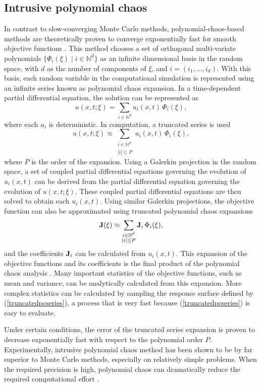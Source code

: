\subsection{Intrusive polynomial chaos}
In contrast to slow-converging Monte Carlo
methods, polynomial-chaos-based methods are theoretically proven to converge
exponentially fast for smooth objective functions \cite[]{poly_chaos}.
This method chooses a set of orthogonal multi-variate
polynomials $\{ \Phi_i(\xi) \;|\; i \in {\mathbb N}^d \}$ as an infinite
dimensional basis in the random space, with $d$ as the number of components
of $\xi$, and $i=(i_1,\ldots,i_d)$.
With this basis, each random variable
in the computational simulation is represented using an infinite series
known as polynomial chaos expansion.  In a time-dependent partial differential
equation, the solution can be represented as
\[ u(x, t; \xi) = \sum_{i \in {\mathbb N}^d} u_i(x, t)\,\Phi_i(\xi) , \]
where each $u_i$ is deterministic.  In computation, a truncated series is used
\begin{equation} \label{truncatedpcseries}
  u(x, t; \xi) \approx \sum_{\substack{i \in {\mathbb N}^d\\|i|\le P}}
   u_i(x, t)\,\Phi_i(\xi) ,
\end{equation}
where $P$ is the order of the expansion.  Using a Galerkin projection in
the random space, a set of coupled partial differential equations governing
the evolution of $u_i(x,t)$ can be derived from the partial differential
equation governing the evolution of $u(x,t;\xi)$.  These coupled partial
differential equations are then solved to obtain each $u_i(x,t)$.
Using similar Galerkin projections, the objective function can also be
approximated using truncated polynomial chaos expansions
\[ {\bf J}(\xi) \approx \sum_{\substack{i \in {\mathbb N}^d\\|i|\le P}}
   {\bf J}_i\,\Phi_i(\xi) , \]
and the coefficients ${\bf J}_i$ can be calculated from $u_i(x,t)$.
This expansion of the objective functions and its coefficients is the
final product of the polynomial chaos analysis \cite[]{polychaos2}.
Many important statistics
of the objective functions, such as mean and variance, can be analytically
calculated from this expansion.  More complex statistics can be calculated
by sampling the response surface defined by (\ref{truncatedpcseries}),
a process that is very fast because (\ref{truncatedpcseries}) is easy
to evaluate.

Under certain conditions, the error of the truncated series expansion is
proven to decrease exponentially fast with respect to the polynomial order $P$.
Experimentally, intrusive polynomial chaos method has been shown to be by far
superior to Monte Carlo methods, especially on relatively simple problems.
When the required precision is high, polynomial chaos can dramatically
reduce the required computational effort \cite[]{polychaos3}.

